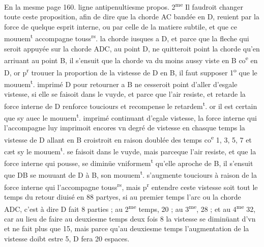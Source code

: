 \documentclass[11pt,a4paper]{article}
\begin{document}
\struck{\ill{}} En la mesme page 160. ligne antipenultiesme propos. 2\textsuperscript{me}
Il faudroit changer toute ceste proposition, afin de dire que la chorde AC bandée en D, reuient par la force de quelque esprit interne, ou par celle de la matiere subtile, et que ce mouuem\textsuperscript{t} accompagne touss\textsuperscript{rs}. la chorde iusques a D, et parce que la fleche qui seroit appuyée sur la chorde ADC, au point D, ne quitteroit point la chorde qu'en arriuant au point B, il s'ensuit que la chorde va du moins aussy viste en B co\textsuperscript{e} en D, or p\textsuperscript{r} trouuer la proportion de la vistesse de D en B, il faut supposer 1\textsuperscript{o} que le mouuem\textsuperscript{t}. imprimé   D pour retourner a B ne cesseroit point d'aller d'esgale vistesse, si elle se faisoit dans le vuyde, et parce que l'air resiste, et retarde la force interne de D renforce touciours et recompense le retardem\textsuperscript{t}. or il est certain que sy auec le mouuem\textsuperscript{t}. imprimé continuant d'egale vistesse, la force interne qui l'accompagne luy imprimoit encores vn degré de vistesse en chasque temps la vistesse de D allant en B croistroit en raison doublée des temps co\textsuperscript{e} 1, 3, 5, 7 et cæt sy le mouuem\textsuperscript{t}. se faisoit dans le vuyde, mais parceque l'air resiste, et que la force interne qui pousse, se diminüe vniformem\textsuperscript{t} qu'elle aproche de B, il s'ensuit que DB se mouuant de D à B, son mouuem\textsuperscript{t}. s'augmente touciours à raison de la force interne qui l'accompagne touss\textsuperscript{rs}, mais p\textsuperscript{r} entendre ceste vistesse soit tout le temps du retour diuisé en 88 partyes, si au premier temps l'arc ou la chorde ADC, c'est à dire D fait 8 parties ; au 2\textsuperscript{me} temps, 20 ; au 3\textsuperscript{me}, 28 ; et au 4\textsuperscript{me} 32, car au lieu de faire au deuxiesme temps deux fois 8 la vistesse se diminüant d'vn et ne fait plus que 15, mais parce qu'au deuxiesme temps l'augmentation de la vistesse doibt estre 5, D fera 20 espaces.
\end{document}
